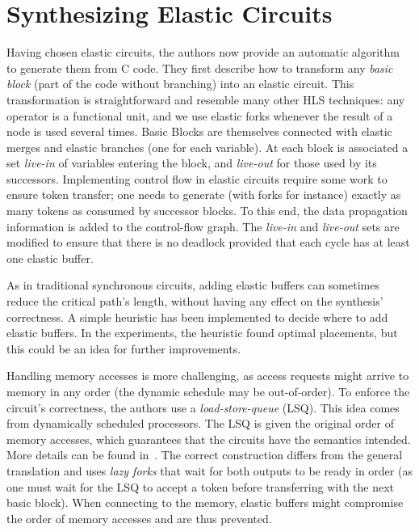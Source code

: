 \documentclass{article}
\begin{document}
\section{Synthesizing Elastic Circuits}
Having chosen elastic circuits, the authors now provide an automatic algorithm to generate them from C code.
They first describe how to transform any \textit{basic block} (part of the code without branching) into an elastic circuit. This transformation is straightforward and resemble many other HLS techniques: any operator is a functional unit, and we use elastic forks whenever the result of a node is used several times.
Basic Blocks are themselves connected with elastic merges and elastic branches (one for each variable).
At each block is associated a set \textit{live-in} of variables entering the block, and \textit{live-out} for those used by its successors.
Implementing control flow in elastic circuits require some work to ensure token transfer; one needs to generate (with forks for instance) exactly as many tokens as consumed by successor blocks. To this end, the data propagation information is added to the control-flow graph. The \textit{live-in} and \textit{live-out} sets are modified to ensure that there is no deadlock provided that each cycle has at least one elastic buffer.

As in traditional synchronous circuits, adding elastic buffers can sometimes reduce the critical path's length, without having any effect on the synthesis' correctness. A simple heuristic has been implemented to decide where to add elastic buffers. In the experiments, the heuristic found optimal placements, but this could be an idea for further improvements.

Handling memory accesses is more challenging, as access requests might arrive to memory in any order (the dynamic schedule may be out-of-order).
To enforce the circuit's correctness, the authors use a \textit{load-store-queue} (LSQ). This idea comes from dynamically scheduled processors. The LSQ is given the original order of memory accesses, which guarantees that the circuits have the semantics intended. More details can be found in~\cite{DBLP:journals/tecs/JosipovicBI17}. The correct construction differs from the general translation and uses \textit{lazy forks} that wait for both outputs to be ready in order (as one must wait for the LSQ to accept a token before transferring with the next basic block). When connecting to the memory, elastic buffers might compromise the order of memory accesses and are thus prevented.
\end{document}
